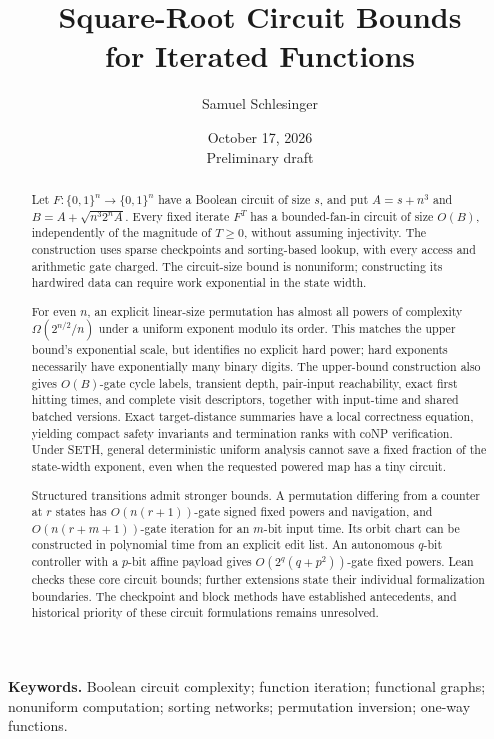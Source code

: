 \documentclass[11pt]{article}
\title{Square-Root Circuit Bounds\\for Iterated Functions}
\author{Samuel Schlesinger}
\date{October 17, 2026\\[3pt]\small Preliminary draft}
\theoremstyle{definition}
\theoremstyle{remark}
\newcommand{\bits}{\{0,1\}}
\numberwithin{equation}{section}
\begin{document}
\maketitle

\begin{abstract}
Let $F:\bits^n\to\bits^n$ have a Boolean circuit of size $s$, and put
$A=s+n^3$ and $B=A+\sqrt{n^3 2^nA}$.  Every fixed iterate $F^T$ has a
bounded-fan-in circuit of size $O(B)$, independently of the magnitude of
$T\geq0$, without assuming injectivity.  The construction uses sparse
checkpoints and sorting-based lookup, with every access and arithmetic gate
charged.  The circuit-size bound is nonuniform; constructing its hardwired
data can require work exponential in the state width.

For even $n$, an explicit linear-size permutation has almost all powers of
complexity $\Omega(2^{n/2}/n)$ under a uniform exponent modulo its order.
This matches the upper bound's exponential scale, but identifies no explicit
hard power; hard exponents necessarily have exponentially many binary digits.
The upper-bound construction also gives $O(B)$-gate cycle labels, transient
depth, pair-input reachability, exact first hitting times, and complete visit
descriptors, together with input-time and shared batched versions.  Exact
target-distance summaries have a local correctness equation, yielding
compact safety invariants and termination ranks with coNP verification.
Under SETH, general deterministic uniform analysis cannot save a fixed fraction of the
state-width exponent, even when the requested powered map has a tiny circuit.

Structured transitions admit stronger bounds.  A permutation differing from
a counter at $r$ states has $O(n(r+1))$-gate signed fixed powers and navigation,
and $O(n(r+m+1))$-gate iteration for an $m$-bit input time.  Its orbit chart
can be constructed in polynomial time from an explicit edit list.  An
autonomous $q$-bit controller with a $p$-bit affine payload gives
$O(2^q(q+p^2))$-gate fixed powers.  Lean checks these core circuit bounds;
further extensions state their individual formalization boundaries.
The checkpoint and block
methods have established antecedents, and historical priority of these
circuit formulations remains unresolved.
\end{abstract}

\noindent\textbf{Keywords.} Boolean circuit complexity; function iteration;
functional graphs; nonuniform computation; sorting networks; permutation
inversion; one-way functions.
\end{document}
